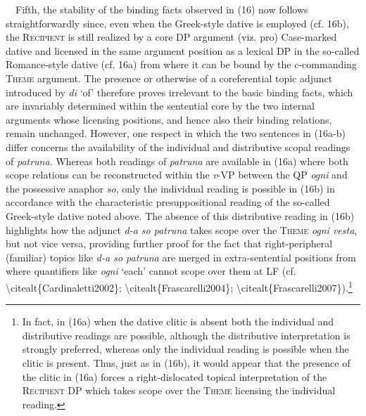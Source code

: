 \documentclass[output=paper,modfonts,nonflat]{langsci/langscibook}
\begin{document}
\begin{styleStandard}
\ \ Fifth, the stability of the binding facts observed in (16) now follows straightforwardly since, even when the Greek-style dative is employed (cf. 16b), the \textsc{Recipient} is still realized by a core DP argument (viz. pro) Case-marked dative and licensed in the same argument position as a lexical DP in the so-called Romance-style dative (cf. 16a) from where it can be bound by the c-commanding \textsc{Theme} argument. The presence or otherwise of a coreferential topic adjunct introduced by \textit{di }‘of’ therefore proves irrelevant to the basic binding facts, which are invariably determined within the sentential core by the two internal arguments whose licensing positions, and hence also their binding relations, remain unchanged. However, one respect in which the two sentences in (16a-b) differ concerns the availability of the individual and distributive scopal readings of \textit{patruna}. Whereas both readings of \textit{patruna} are available in (16a) where both scope relations can be reconstructed within the \textit{v}{}-VP between the QP \textit{ogni }and the possessive anaphor \textit{so}, only the individual reading is possible in (16b) in accordance with the characteristic presuppositional reading of the so-called Greek-style dative noted above. The absence of this distributive reading in (16b) highlights how the adjunct \textit{d-a so patruna }takes scope over the \textsc{Theme} \textit{ogni vesta}, but not vice versa, providing further proof for the fact that right-peripheral (familiar) topics like \textit{d-a so patruna }are merged in extra-sentential positions from where quantifiers like \textit{ogni }‘each’ cannot scope over them at LF (cf. {\textbackslash}citealt\{Cardinaletti2002\}; {\textbackslash}citealt\{Frascarelli2004\}; {\textbackslash}citealt\{Frascarelli2007\}).\footnote{ In fact, in (16a) when the dative clitic is absent both the individual and distributive readings are possible, although the distributive interpretation is strongly preferred, whereas only the individual reading is possible when the clitic is present. Thus, just as in (16b), it would appear that the presence of the clitic in (16a) forces a right-dislocated topical interpretation of the \textsc{Recipient} DP which takes scope over the \textsc{Theme} licensing the individual reading.}
\end{styleStandard}
\end{document}
